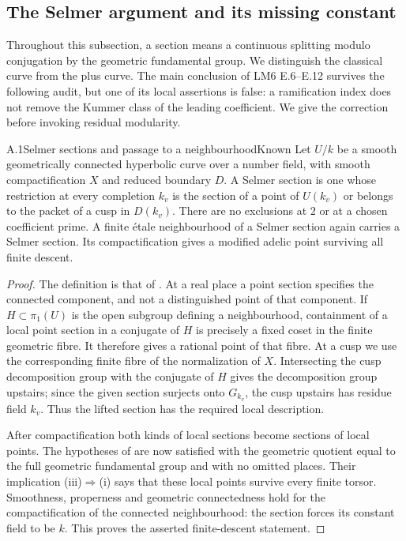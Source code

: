 \subsection{The Selmer argument and its missing constant}

Throughout this subsection, a section means a continuous splitting modulo
conjugation by the geometric fundamental group. We distinguish the classical
curve from the plus curve. The main conclusion of LM6 E.6--E.12 survives the
following audit, but one of its local assertions is false: a ramification index
does not remove the Kummer class of the leading coefficient. We give the
correction before invoking residual modularity.

\begin{statement}{A.1}{Selmer sections and passage to a neighbourhood}{Known}
Let $U/k$ be a smooth geometrically connected hyperbolic curve over a number
field, with smooth compactification $X$ and reduced boundary $D$.
A Selmer section is one whose restriction at every completion $k_v$ is the
section of a point of $U(k_v)$ or belongs to the packet of a cusp in $D(k_v)$.
There are no exclusions at $2$ or at a chosen coefficient prime.
A finite \'etale neighbourhood of a Selmer section again carries a Selmer
section. Its compactification gives a modified adelic point surviving all
finite descent.
\end{statement}
\begin{proof}
The definition is that of \citet[\S3.3]{AMSteklov2026}. At a real place a
point section specifies the connected component, and not a distinguished
point of that component. If $H\subset\pi_1(U)$ is the open subgroup defining
a neighbourhood, containment of a local point section in a conjugate of $H$
is precisely a fixed coset in the finite geometric fibre. It therefore gives
a rational point of that fibre. At a cusp we use the corresponding finite
fibre of the normalization of $X$. Intersecting the cusp decomposition group
with the conjugate of $H$ gives the decomposition group upstairs; since the
given section surjects onto $G_{k_v}$, the cusp upstairs has residue field
$k_v$. Thus the lifted section has the required local description.

After compactification both kinds of local sections become sections of
local points. The hypotheses of \citet[Theorem 2.1]{AMHarariStix2012}
are now satisfied with the geometric quotient equal to the full geometric
fundamental group and with no omitted places. Their implication
(iii)$\Rightarrow$(i) says that these local points survive every finite
torsor. Smoothness, properness and geometric connectedness hold for the
compactification of the connected neighbourhood: the section forces its
constant field to be $k$. This proves the asserted finite-descent statement.
\end{proof}

